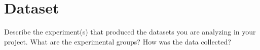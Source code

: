 
\section{Dataset}

Describe the experiment(s) that produced the datasets you are analyzing in your project.
What are the experimental groups? How was the data collected?
